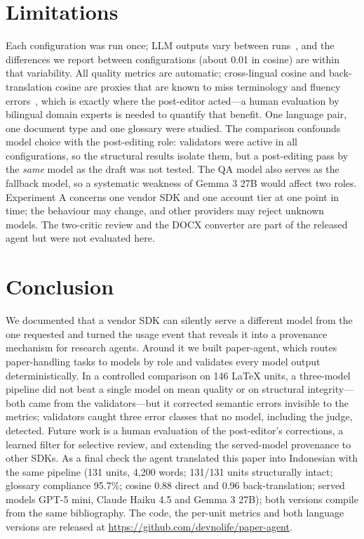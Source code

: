 \section{Limitations}
\label{sec:limits}
Each configuration was run once; LLM outputs vary between runs~\cite{arya2026wizard}, and the differences we report between configurations (about 0.01 in cosine) are within that variability. All quality metrics are automatic; cross-lingual cosine and back-translation cosine are proxies that are known to miss terminology and fluency errors~\cite{freitag2021mqm,moon2020roundtrip}, which is exactly where the post-editor acted---a human evaluation by bilingual domain experts is needed to quantify that benefit. One language pair, one document type and one glossary were studied. The comparison confounds model choice with the post-editing role: validators were active in all configurations, so the structural results isolate them, but a post-editing pass by the \emph{same} model as the draft was not tested. The QA model also serves as the fallback model, so a systematic weakness of Gemma 3 27B would affect two roles. Experiment A concerns one vendor SDK and one account tier at one point in time; the behaviour may change, and other providers may reject unknown models. The two-critic review and the DOCX converter are part of the released agent but were not evaluated here.

\section{Conclusion}
\label{sec:conclusion}
We documented that a vendor SDK can silently serve a different model from the one requested and turned the usage event that reveals it into a provenance mechanism for research agents. Around it we built paper-agent, which routes paper-handling tasks to models by role and validates every model output deterministically. In a controlled comparison on 146 LaTeX units, a three-model pipeline did not beat a single model on mean quality or on structural integrity---both came from the validators---but it corrected semantic errors invisible to the metrics; validators caught three error classes that no model, including the judge, detected. Future work is a human evaluation of the post-editor's corrections, a learned filter for selective review, and extending the served-model provenance to other SDKs. As a final check the agent translated this paper into Indonesian with the same pipeline (131 units, 4{,}200 words; 131/131 units structurally intact; glossary compliance 95.7\%; cosine 0.88 direct and 0.96 back-translation; served models GPT-5 mini, Claude Haiku 4.5 and Gemma 3 27B); both versions compile from the same bibliography. The code, the per-unit metrics and both language versions are released at \url{https://github.com/devnolife/paper-agent}.
